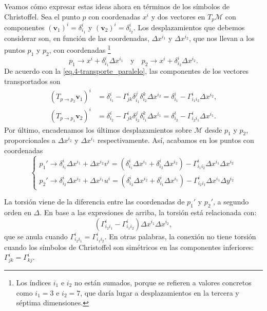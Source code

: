 Veamos cómo expresar estas ideas ahora en términos de los símbolos de Christoffel. Sea el punto \(p\) con coordenadas \(x^i\) y dos vectores en \(T_p\mathcal{M}\) con componentes \((\mathbf{v}_1)^i = \delta^{i}_{i_1}\) y \((\mathbf{v}_2)^i = \delta^{i}_{i_2}\). Los desplazamientos que debemos considerar son, en función de las coordenadas, \(\Delta x^{i_1}\) y \(\Delta x^{i_2}\), que nos llevan a los puntos \(p_1\) y \(p_2\), con coordenadas \footnote{Los índices \(i_1\) e \(i_2\) no están sumados, porque se refieren a valores concretos como \(i_1 = 3\) e \(i_2 = 7\), que daría lugar a desplazamientos en la tercera y séptima dimensiones.}
\begin{equation*}
    p_1 \rightarrow x^i + \delta^{i}_{i_1} \Delta x^{i_1} \quad\text{y}\quad p_2 \rightarrow x^i + \delta^{i}_{i_2} \Delta x^{i_2}.
\end{equation*}
De acuerdo con la \cref{eq.4-transporte_paralelo}, las componentes de los vectores transportados son
\begin{align*}
    (T_{p\rightarrow p_2}\mathbf{v}_1)^i &= \delta^{i}_{i_1} - \Gamma^{i}_{j k} \delta^{j}_{i_1} \delta^{k}_{i_2} \Delta x^{i_2} = \delta^{i}_{i_1} - \Gamma^{i}_{i_1 i_2} \Delta x^{i_2}, \\
    (T_{p\rightarrow p_1}\mathbf{v}_2)^i &= \delta^{i}_{i_2} - \Gamma^{i}_{j k} \delta^{j}_{i_2} \delta^{k}_{i_1}\Delta x^{i_1} = \delta^{i}_{i_2} - \Gamma^{i}_{i_2 i_1} \Delta x^{i_1}.
\end{align*}
Por último, encadenamos los últimos desplazamientos sobre \(\mathcal{M}\) desde \(p_1\) y \(p_2\), proporcionales a \(\Delta x^{i_2}\) y \(\Delta x^{i_1}\) respectivamente. Así, acabamos en los puntos con coordenadas
\begin{equation*}
    \left\{
    \begin{aligned}
        p_1' \rightarrow \delta^{i}_{i_1}\Delta x^{i_1} + \Delta x^{i_2}v^i = \left(\delta^{i}_{i_1}\Delta x^{i_1} + \delta^{i}_{i_2}\Delta x^{i_2}\right) - \Gamma^{i}_{i_1 i_2} \Delta x^{i_1}\Delta x^{i_2}\\
        p_2' \rightarrow \delta^{i}_{i_2}\Delta x^{i_2} + \Delta x^{i_1}u^i = \left(\delta^{i}_{i_2}\Delta x^{i_2} + \delta^{i}_{i_1}\Delta x^{i_1}\right) - \Gamma^{i}_{i_2i_1} \Delta x^{i_1}\Delta y^{i_2}
    \end{aligned}
    \right.
\end{equation*}

La torsión viene de la diferencia entre las coordenadas de \(p_1'\) y \(p_2'\), a segundo orden en \(\Delta\). En base a las expresiones de arriba, la torsión está relacionada con:
\begin{equation*}
    \left(\Gamma^{i}_{i_2 i_1}- \Gamma^{i}_{i_1 i_2}\right)\Delta x^{i_1}\Delta x^{i_2},
\end{equation*}
que se anula cuando \(\Gamma^{i}_{i_2 i_1} = \Gamma^{i}_{i_1 i_2}\). En otras palabras, la conexión no tiene torsión cuando los símbolos de Christoffel son simétricos en las componentes inferiores: \(\Gamma^{i}_{jk} = \Gamma^i_{kj}\).


